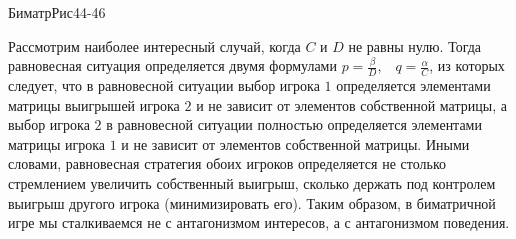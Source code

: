 БиматрРис44-46



Рассмотрим наиболее интересный случай, когда
$C $ и $D $ не равны нулю.  Тогда равновесная ситуация определяется
двумя формулами $ p=\frac{\beta}{D},$ \, $q=\frac{\alpha }{C}$, из которых
следует, что в равновесной ситуации выбор игрока $ 1$ определяется
элементами матрицы выигрышей игрока $ 2$ и не зависит от элементов
собственной матрицы, а выбор игрока $ 2$ в равновесной ситуации
полностью определяется элементами матрицы игрока $1 $ и не зависит от
элементов собственной матрицы. Иными словами, равновесная стратегия
обоих игроков определяется не столько стремлением увеличить
собственный выигрыш, сколько держать под контролем выигрыш другого
игрока (минимизировать его). Таким образом, в биматричной игре мы
сталкиваемся не с антагонизмом интересов, а с антагонизмом поведения.


